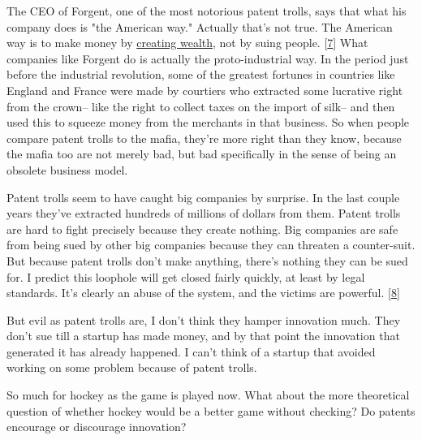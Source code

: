The
                  CEO of Forgent, one of the most notorious patent trolls, says
                  that what his company does is "the American way." Actually
                  that's not true. The American way is to make money by
                  \href{http://www.paulgraham.com/wealth.html}{creating wealth}, not by suing
                  people.
                  [\href{\#f7n}{7}]
                  What companies like Forgent do is actually the
                  proto-industrial way. In the period just before the industrial
                  revolution, some of the greatest fortunes in countries like
                  England and France were made by courtiers who extracted some
                  lucrative right from the crown-- like the right to collect
                  taxes on the import of silk-- and then used this to squeeze
                  money from the merchants in that business. So when people
                  compare patent trolls to the mafia, they're more right than
                  they know, because the mafia too are not merely bad, but bad
                  specifically in the sense of being an obsolete business
                  model.

Patent trolls seem to have caught big
                  companies by surprise. In the last couple years they've
                  extracted hundreds of millions of dollars from them. Patent
                  trolls are hard to fight precisely because they create
                  nothing. Big companies are safe from being sued by other big
                  companies because they can threaten a counter-suit. But
                  because patent trolls don't make anything, there's nothing
                  they can be sued for. I predict this loophole will get closed
                  fairly quickly, at least by legal standards. It's clearly an
                  abuse of the system, and the victims are powerful.
                  [\href{\#f8n}{8}]

But evil as patent trolls are, I don't think they
                  hamper innovation much. They don't sue till a startup has made
                  money, and by that point the innovation that generated it has
                  already happened. I can't think of a startup that avoided
                  working on some problem because of patent trolls.

So
                  much for hockey as the game is played now. What about the more
                  theoretical question of whether hockey would be a better game
                  without checking? Do patents encourage or discourage
                  innovation?

